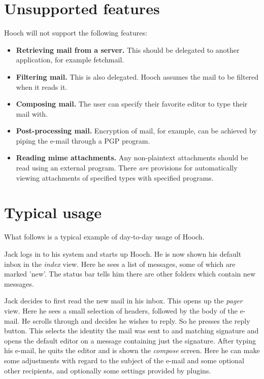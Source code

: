 \documentclass[a4paper]{book}
\begin{document}
\section{Unsupported features}

Hooch will not support the following features:
\begin{itemize}
\item {\bf Retrieving mail from a server.} This should be delegated to
	another application, for example fetchmail.
\item {\bf Filtering mail.} This is also delegated. Hooch assumes the mail
	to be filtered when it reads it.
\item {\bf Composing mail.} The user can specify their favorite editor to
	type their mail with.
\item {\bf Post-processing mail.} Encryption of mail, for example, can be
	achieved by piping the e-mail through a PGP program.
\item {\bf Reading mime attachments.} Any non-plaintext attachments should
	be read using an external program. There \emph{are} provisions for
	automatically viewing attachments of specified types with specified
	programs.
\end{itemize}


\section{Typical usage}

What follows is a typical example of day-to-day usage of Hooch.

Jack logs in to his system and starts up Hooch. He is now shown his default
inbox in the \emph{index} view. Here he sees a list of messages, some of which
are marked 'new'. The status bar tells him there are other folders which
contain new messages.

Jack decides to first read the new mail in his inbox. This opens up the
\emph{pager} view. Here he sees a small selection of headers, followed by
the body of the e-mail. He scrolls through and decides he wishes to reply.
So he presses the reply button. This selects the identity the mail was sent
to and matching signature and opens the default editor on a message
containing just the signature. After typing his e-mail, he quits the editor
and is shown the \emph{compose} screen. Here he can make some adjustments
with regard to the subject of the e-mail and some optional other recipients,
and optionally some settings provided by plugins.
\end{document}
